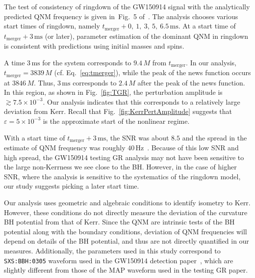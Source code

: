 \tgr

The test of consistency of ringdown of the GW150914 signal with the analytically predicted QNM frequency is given in~Fig.~5 of~\cite{TheLIGOScientific:2016src}. The analysis chooses various start times of ringdown, namely $t_\mathrm{merger} + 0,~1,~3,~5,~6.5\,\mathrm{ms}$. At a start time of $t_\mathrm{merger} + 3\,\mathrm{ms}$ (or later), parameter estimation of the dominant QNM in ringdown is consistent with predictions using initial masses and spins. 

A time $3\,\mathrm{ms}$ for the system corresponds to $9.4\,M$ from $t_\mathrm{merger}$. In our analysis, $t_\mathrm{merger} = 3839\,M$ (cf. Eq.~\eqref{eq:tmerger}), while the peak of the news function occurs at $3846\,M$. Thus, $3\,\mathrm{ms}$ corresponds to $2.4\,M$ after the peak of the news function. In this region, as shown in Fig.~\ref{fig:TGR}, the perturbation amplitude is ${}\gtrsim 7.5 \times 10^{-3}$. Our analysis indicates that this corresponds to a relatively large deviation from Kerr. Recall that Fig.~\ref{fig:KerrPertAmplitude} suggests that $\varepsilon = 5 \times 10^{-3}$ is the approximate start of the nonlinear regime. 

With a start time of $t_\mathrm{merger} + 3\,\mathrm{ms}$, the SNR was about $8.5$ and the spread in the estimate of QNM frequency was roughly $40\,\mathrm{Hz}$~\cite{TheLIGOScientific:2016src}. Because of this low SNR and high spread, the GW150914 testing GR analysis may not have been sensitive to the large non-Kerrness we see close to the BH. However, in the case of higher SNR, where the analysis is sensitive to the systematics of the ringdown model, our study suggests picking a later start time. 

Our analysis uses geometric and algebraic conditions to identify isometry to Kerr. However, these conditions do not directly measure the deviation of the curvature BH potential from that of Kerr. Since the QNM are intrinsic tests of the BH potential along with the boundary conditions, deviation of QNM frequencies will depend on details of the BH potential, and thus are not directly quantified in our measures. Additionally, the parameters used in this study correspond to \texttt{SXS:BBH:0305} waveform used in the GW150914 detection paper~\cite{Abbott:2016blz}, which are slightly different from those of the MAP waveform used in the testing GR paper. 



